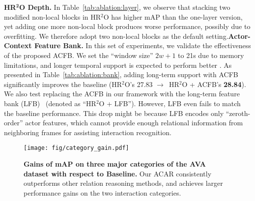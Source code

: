 {\flushleft \bf HR$^\mathbf{2}$O Depth.} In Table~\ref{tab:ablation:layer}, we observe that stacking two modified non-local blocks in HR$^2$O has higher mAP than the one-layer version, yet adding one more non-local block produces worse performance, possibly due to overfitting. We therefore adopt two non-local blocks as the default setting.{\flushleft \bf Actor-Context Feature Bank.} In this set of experiments, we validate the effectiveness of the proposed ACFB. We set the ``window size'' $2w+1$ to 21s due to memory limitations, and longer temporal support is expected to perform better \cite{wu2019long}. 
As presented in Table~\ref{tab:ablation:bank}, adding long-term support with ACFB significantly improves the baseline (HR$^2$O's 27.83 $\rightarrow$\ HR$^2$O + ACFB's \textbf{28.84}).
We also test replacing the ACFB in our framework with the long-term feature bank (LFB)~\cite{wu2019long} (denoted as ``HR$^2$O + LFB''). However, LFB even fails to match the baseline performance. This drop might be because LFB encodes only ``zeroth-order'' actor features, which cannot provide enough relational information from neighboring frames for assisting interaction recognition.




\begin{figure}[t]
\centering
\texttt{[image: fig/category\_gain.pdf]}
\caption{\textbf{Gains of mAP on three major categories of the AVA dataset with respect to Baseline.} Our ACAR consistently outperforms other relation reasoning methods, and achieves larger performance gains on the two interaction categories. \label{fig:catgain}}

\end{figure}
















